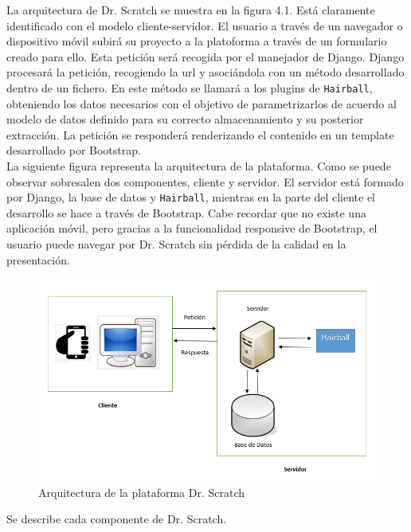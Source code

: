 \documentclass[a4paper, 12pt]{book}
\begin{document}
La arquitectura de Dr. Scratch se muestra en la figura 4.1. Está claramente identificado
con el modelo cliente-servidor. El usuario a través de un navegador o dispositivo móvil
subirá su proyecto a la platoforma a través de un formulario creado para ello. Esta 
petición será recogida por el manejador de Django. Django procesará la petición, recogiendo
la url y asociándola con un método desarrollado dentro de un fichero. En este método
se llamará a los plugins de \texttt{Hairball}, obteniendo los datos necesarios con el
objetivo de parametrizarlos de acuerdo  al modelo de datos definido para su correcto 
almacenamiento y su posterior extracción. La petición se responderá renderizando 
el contenido en un template desarrollado por Bootstrap. \\


La siguiente figura representa la arquitectura de la plataforma. Como se puede observar
sobresalen dos componentes, cliente y servidor. El servidor está formado por Django,
la base de datos y \texttt{Hairball}, mientras en la parte del cliente el desarrollo
se hace a través de Bootstrap. Cabe recordar que no existe una aplicación móvil, 
pero gracias a la funcionalidad responsive de Bootstrap, el usuario puede 
navegar por Dr. Scratch sin pérdida de la calidad en la presentación. \\


\begin{figure}
  \centering
	\graphicspath{{img/}}
  \includegraphics[bb=0 0 800 600, width=14cm, keepaspectratio]{arquitecturascratch.png}
	\caption{Arquitectura de la plataforma Dr. Scratch}
  \label{figura:foro_hilos}
\end{figure}

Se describe cada componente de Dr. Scratch.
\end{document}
